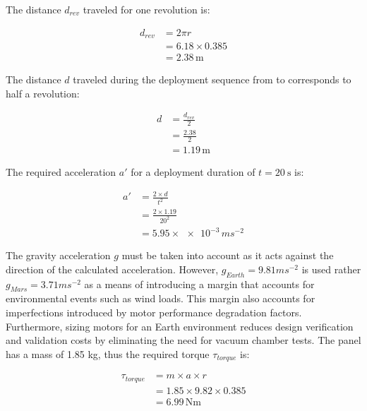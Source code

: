 The distance $d_{rev}$ traveled for one revolution is:

\begin{align}
  \label{eq:solar-panel-deployment-revolution}
  d_{rev} &= 2\pi r\\
          &= 6.18 \times 0.385\\
          &= 2.38\,\si{\meter}
\end{align}

The distance $d$ traveled during the deployment sequence from  to  corresponds to half a revolution:

\begin{align}
  \label{eq:solar-panel-deployment-distance}
  d &= \frac{d_{rev}}{2}\\
    &= \frac{2.38}{2}\\
    &= 1.19\,\si{\meter}
\end{align}

The required acceleration $a'$ for a deployment duration of $t = \SI{20}{\second}$ is:

\begin{align}
  \label{eq:solar-panel-deployment-acceleration1}
  a' &= \frac{2 \times d}{t^{2}}\\
    &= \frac{2 \times 1.19}{20^{2}}\\
    &= 5.95\times\num{e-3}\,\si{ms^{-2}}
\end{align}

The gravity acceleration $g$ must be taken into account as it acts against the direction of the calculated acceleration. However, $g_{Earth} = 9.81 \si{ms^{-2}}$ is used rather $g_{Mars} = 3.71 \si{ms^{-2}}$ as a means of introducing a margin that accounts for environmental events such as wind loads. This margin also accounts for imperfections introduced by motor performance degradation factors. Furthermore, sizing motors for an Earth environment reduces design verification and validation costs by eliminating the need for vacuum chamber tests. The panel has a mass of 1.85 \si{\kilo\gram}, thus the required torque $\tau_{torque}$ is:

\begin{align}
  \label{eq:solar-panel-deployment-torque}
  \tau_{torque} &= m \times a \times r\\
                &= 1.85 \times 9.82 \times 0.385\\
                &= 6.99\,\si{\newton\meter}
\end{align}

